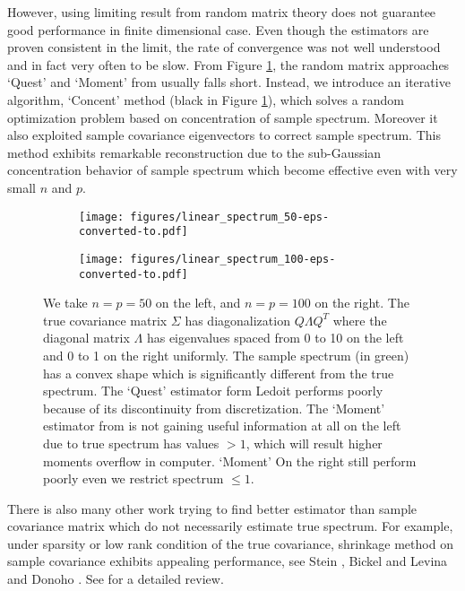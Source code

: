 \documentclass[12pt]{extarticle}
\newcommand{\1}{\field{1}}
\numberwithin{equation}{section}
\begin{document}
However, using limiting result from random matrix theory does not guarantee good performance in finite dimensional case. Even though the estimators are proven consistent in the limit, the rate of convergence was not well understood and in fact very often to be slow. From Figure \ref{fig: compare eigen and Quest 50, 100}, the random matrix approaches `Quest'  \cite{ledoit2015} and `Moment' from \cite{Valiant} usually falls short. Instead, we introduce an iterative algorithm, `Concent' method (black in Figure \ref{fig: compare eigen and Quest 50, 100}), which solves a random optimization problem based on concentration of sample spectrum.  Moreover it also exploited sample covariance eigenvectors to correct sample spectrum. This method exhibits remarkable reconstruction due to the sub-Gaussian concentration behavior of sample spectrum which become effective even with very small $n$ and $p$.  
\begin{figure}[H]
\centering
	\begin{subfigure}[t]{.45\textwidth}
		\centering
		\texttt{[image: figures/linear\_spectrum\_50-eps-converted-to.pdf]}	
	\end{subfigure}
	\begin{subfigure}[t]{.45\textwidth}
		\centering
		\texttt{[image: figures/linear\_spectrum\_100-eps-converted-to.pdf]}
	\end{subfigure}
	\caption{We take $n=p=50$ on the left, and $n=p=100$ on the right. The true covariance matrix $\Sigma$ has diagonalization $Q\Lambda Q^T$ where the diagonal matrix $\Lambda$ has eigenvalues spaced from 0 to 10 on the left and 0 to 1 on the right uniformly. The sample spectrum (in green) has a convex shape which is significantly different from the true spectrum. The `Quest' estimator form Ledoit \cite{ledoit2015} performs poorly because of its discontinuity from discretization. The `Moment' estimator from \cite{Valiant} is not gaining useful information at all on the left due to true spectrum has values $>1$, which will result higher moments overflow in computer. `Moment' On the right still perform poorly even we restrict spectrum $\le 1$.}\label{fig: compare eigen and Quest 50, 100}
\end{figure}

There is also many other work trying to find better estimator than sample covariance matrix which do not necessarily estimate true spectrum. For example,  under sparsity or low rank condition of the true covariance, shrinkage method on sample covariance exhibits appealing performance, see Stein \cite{Stein}, Bickel and Levina \cite{Bickel} and Donoho \cite{Donoho}.  See \cite{fan2016overview} for a detailed review.
\end{document}
